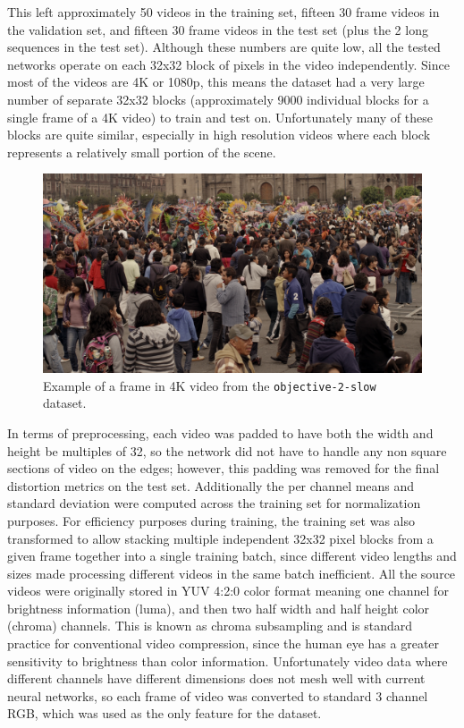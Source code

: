 \documentclass[10pt,twocolumn,letterpaper]{article}
\begin{document}
This left approximately 50 videos in the training set, fifteen 30 frame videos in the validation set, and fifteen 30 frame videos in the test set (plus the 2 long sequences in the test set). Although these numbers are quite low, all the tested networks operate on each 32x32 block of pixels in the video independently. Since most of the videos are 4K or 1080p, this means the dataset had a very large number of separate 32x32 blocks (approximately 9000 individual blocks for a single frame of a 4K video) to train and test on. Unfortunately many of these blocks are quite similar, especially in high resolution videos where each block represents a relatively small portion of the scene.

\begin{figure}[t]
\begin{center}
  \includegraphics[width=0.8\linewidth]{data_example}
\end{center}
   \caption{Example of a frame in 4K video from the \texttt{objective-2-slow} dataset.}
\end{figure}

In terms of preprocessing, each video was padded to have both the width and height be multiples of 32, so the network did not have to handle any non square sections of video on the edges; however, this padding was removed for the final distortion metrics on the test set. Additionally the per channel means and standard deviation were computed across the training set for normalization purposes. For efficiency purposes during training, the training set was also transformed to allow stacking multiple independent 32x32 pixel blocks from a given frame together into a single training batch, since different video lengths and sizes made processing different videos in the same batch inefficient. All the source videos were originally stored in YUV 4:2:0 color format meaning one channel for brightness information (luma), and then two half width and half height color (chroma) channels. This is known as chroma subsampling \cite{van2001vision} and is standard practice for conventional video compression, since the human eye has a greater sensitivity to brightness than color information. Unfortunately video data where different channels have different dimensions does not mesh well with current neural networks, so each frame of video was converted to standard 3 channel RGB, which was used as the only feature for the dataset.
\end{document}
